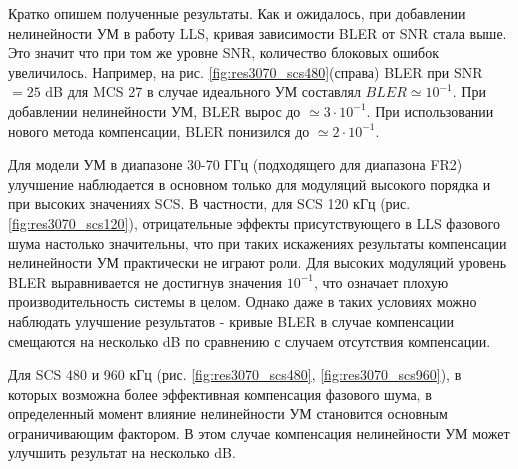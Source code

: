 Кратко опишем полученные результаты. Как и ожидалось, при добавлении
нелинейности УМ в работу LLS, кривая зависимости BLER от SNR стала выше.
Это значит что при том же уровне SNR, количество блоковых ошибок
увеличилось. Например, на рис. \ref{fig:res3070_scs480}(справа)
BLER при SNR$=25$ dB для MCS 27 в случае идеального УМ составлял
$BLER\simeq 10^{-1}$. При добавлении нелинейности УМ, BLER вырос до
$\simeq 3\cdot10^{-1}$. При использовании нового метода компенсации, BLER
понизился до $\simeq 2\cdot10^{-1}$.

Для модели УМ в диапазоне 30-70 ГГц (подходящего для диапазона FR2)
улучшение наблюдается в основном только для модуляций высокого порядка и
при высоких значениях SCS. В частности, для SCS 120 кГц (рис.
\ref{fig:res3070_scs120}), отрицательные эффекты присутствующего в LLS
фазового шума настолько значительны, что при таких искажениях результаты
компенсации нелинейности УМ практически не играют роли. Для высоких
модуляций уровень BLER выравнивается не достигнув значения $10^{-1}$, что
означает плохую производительность системы в целом. Однако даже в таких
условиях можно наблюдать улучшение результатов - кривые BLER в случае
компенсации смещаются на несколько dB по сравнению с случаем отсутствия
компенсации.

Для SCS 480 и 960 кГц (рис. \ref{fig:res3070_scs480},
\ref{fig:res3070_scs960}), в которых возможна более эффективная компенсация
фазового шума, в определенный момент влияние нелинейности УМ становится
основным ограничивающим фактором. В этом случае компенсация нелинейности УМ
может улучшить результат на несколько dB.

